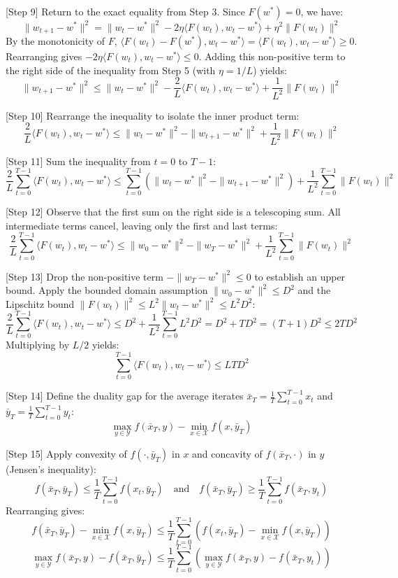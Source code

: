 \documentclass{article}
\begin{document}
[Step 9] Return to the exact equality from Step 3. Since $F(w^*) = 0$, we have:
$$ \|w_{t+1} - w^*\|^2 = \|w_t - w^*\|^2 - 2\eta \langle F(w_t), w_t - w^* \rangle + \eta^2 \|F(w_t)\|^2 $$
By the monotonicity of $F$, $\langle F(w_t) - F(w^*), w_t - w^* \rangle = \langle F(w_t), w_t - w^* \rangle \geq 0$. Rearranging gives $-2\eta \langle F(w_t), w_t - w^* \rangle \leq 0$. Adding this non-positive term to the right side of the inequality from Step 5 (with $\eta = 1/L$) yields:
$$ \|w_{t+1} - w^*\|^2 \leq \|w_t - w^*\|^2 - \frac{2}{L} \langle F(w_t), w_t - w^* \rangle + \frac{1}{L^2} \|F(w_t)\|^2 $$

[Step 10] Rearrange the inequality to isolate the inner product term:
$$ \frac{2}{L} \langle F(w_t), w_t - w^* \rangle \leq \|w_t - w^*\|^2 - \|w_{t+1} - w^*\|^2 + \frac{1}{L^2} \|F(w_t)\|^2 $$

[Step 11] Sum the inequality from $t=0$ to $T-1$:
$$ \frac{2}{L} \sum_{t=0}^{T-1} \langle F(w_t), w_t - w^* \rangle \leq \sum_{t=0}^{T-1} \left( \|w_t - w^*\|^2 - \|w_{t+1} - w^*\|^2 \right) + \frac{1}{L^2} \sum_{t=0}^{T-1} \|F(w_t)\|^2 $$

[Step 12] Observe that the first sum on the right side is a telescoping sum. All intermediate terms cancel, leaving only the first and last terms:
$$ \frac{2}{L} \sum_{t=0}^{T-1} \langle F(w_t), w_t - w^* \rangle \leq \|w_0 - w^*\|^2 - \|w_T - w^*\|^2 + \frac{1}{L^2} \sum_{t=0}^{T-1} \|F(w_t)\|^2 $$

[Step 13] Drop the non-positive term $-\|w_T - w^*\|^2 \leq 0$ to establish an upper bound. Apply the bounded domain assumption $\|w_0 - w^*\|^2 \leq D^2$ and the Lipschitz bound $\|F(w_t)\|^2 \leq L^2 \|w_t - w^*\|^2 \leq L^2 D^2$:
$$ \frac{2}{L} \sum_{t=0}^{T-1} \langle F(w_t), w_t - w^* \rangle \leq D^2 + \frac{1}{L^2} \sum_{t=0}^{T-1} L^2 D^2 = D^2 + T D^2 = (T+1)D^2 \leq 2TD^2 $$
Multiplying by $L/2$ yields:
$$ \sum_{t=0}^{T-1} \langle F(w_t), w_t - w^* \rangle \leq L T D^2 $$

[Step 14] Define the duality gap for the average iterates $\bar{x}_T = \frac{1}{T} \sum_{t=0}^{T-1} x_t$ and $\bar{y}_T = \frac{1}{T} \sum_{t=0}^{T-1} y_t$:
$$ \max_{y \in \mathcal{Y}} f(\bar{x}_T, y) - \min_{x \in \mathcal{X}} f(x, \bar{y}_T) $$

[Step 15] Apply convexity of $f(\cdot, \bar{y}_T)$ in $x$ and concavity of $f(\bar{x}_T, \cdot)$ in $y$ (Jensen's inequality):
$$ f(\bar{x}_T, \bar{y}_T) \leq \frac{1}{T} \sum_{t=0}^{T-1} f(x_t, \bar{y}_T) \quad \text{and} \quad f(\bar{x}_T, \bar{y}_T) \geq \frac{1}{T} \sum_{t=0}^{T-1} f(\bar{x}_T, y_t) $$
Rearranging gives:
$$ f(\bar{x}_T, \bar{y}_T) - \min_{x \in \mathcal{X}} f(x, \bar{y}_T) \leq \frac{1}{T} \sum_{t=0}^{T-1} \left( f(x_t, \bar{y}_T) - \min_{x \in \mathcal{X}} f(x, \bar{y}_T) \right) $$
$$ \max_{y \in \mathcal{Y}} f(\bar{x}_T, y) - f(\bar{x}_T, \bar{y}_T) \leq \frac{1}{T} \sum_{t=0}^{T-1} \left( \max_{y \in \mathcal{Y}} f(\bar{x}_T, y) - f(\bar{x}_T, y_t) \right) $$
\end{document}
